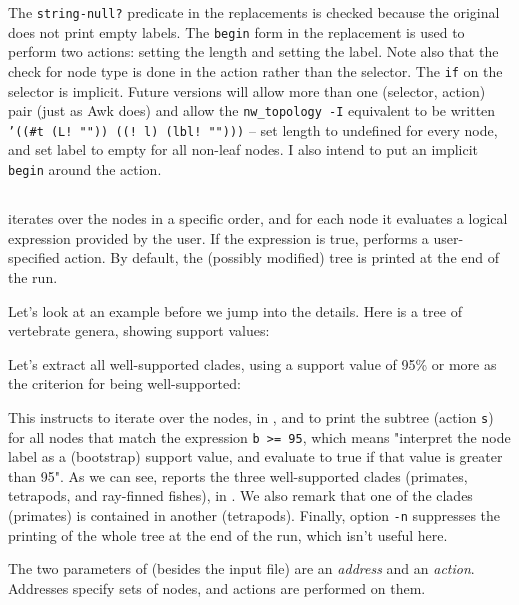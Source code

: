 The {\tt string-null?} predicate in the  replacements is checked
because the original  does not print empty labels. The {\tt begin} form
in the \topology{} replacement is used to perform two actions: setting the
length and setting the label. Note also that the check for node type is done in
the action rather than the selector. The {\tt if} on the selector is implicit.
Future versions will allow more than one (selector, action) pair (just as Awk
does) and allow the {\tt nw\_topology -I} equivalent to be written {\tt '((\#t
(L! "")) ((! l) (lbl! "")))} -- set length to undefined for every node, and set
label to empty for all non-leaf nodes. I also intend to put an implicit {\tt
begin} around the action.

\subsection{\ed}

\ed{} iterates over the nodes in a specific order, and for each node it
evaluates a logical expression provided by the user. If the expression is true,
\ed{} performs a user-specified action.  By default, the (possibly modified)
tree is printed at the end of the run.

Let's look at an example before we jump into the details. Here is a tree of vertebrate genera, showing support values:

\noindent{}Let's extract all well-supported clades, using a support value of 95\% or more as the criterion for being well-supported:


\begin{samepage}

\end{samepage}

\noindent{}This instructs \ed{} to iterate over the nodes, in \no{}, and to
print the subtree (action \texttt{s}) for all nodes that match the expression
\texttt{b >= 95}, which means "interpret the node label as a (bootstrap) support
value, and evaluate to true if that value is greater than 95". As we can see,
\ed{} reports the three well-supported clades (primates, tetrapods, and
ray-finned fishes), in \no. We also remark that one of the clades (primates) is
contained in another (tetrapods). Finally, option \texttt{-n} suppresses
the printing of the whole tree at the end of the run, which isn't useful here.

The two parameters of \ed{} (besides the input file) are an \emph{address} and
an \emph{action}. Addresses specify sets of nodes, and actions are performed on
them. 

